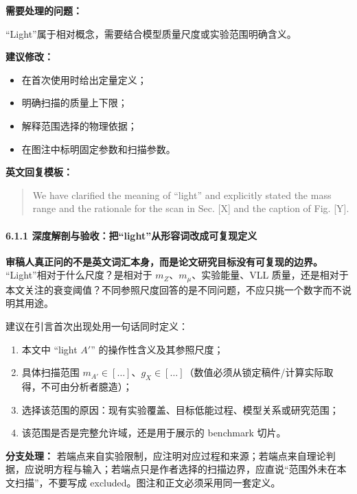 \documentclass[
  chinese,
  UTF8]{ctexart}
\providecommand{\tightlist}{%
  \setlength{\itemsep}{0pt}\setlength{\parskip}{0pt}}
\begin{document}
\textbf{需要处理的问题：}

``Light''属于相对概念，需要结合模型质量尺度或实验范围明确含义。

\textbf{建议修改：}

\begin{itemize}
\tightlist
\item
  在首次使用时给出定量定义；
\item
  明确扫描的质量上下限；
\item
  解释范围选择的物理依据；
\item
  在图注中标明固定参数和扫描参数。
\end{itemize}

\textbf{英文回复模板：}

\begin{quote}
We have clarified the meaning of ``light'' and explicitly stated the
mass range and the rationale for the scan in Sec. {[}X{]} and the
caption of Fig. {[}Y{]}.
\end{quote}

\paragraph{6.1.1
深度解剖与验收：把``light''从形容词改成可复现定义}\label{ux6df1ux5ea6ux89e3ux5256ux4e0eux9a8cux6536ux628alightux4eceux5f62ux5bb9ux8bcdux6539ux6210ux53efux590dux73b0ux5b9aux4e49}

\textbf{审稿人真正问的不是英文词汇本身，而是论文研究目标没有可复现的边界。}
``Light''相对于什么尺度？是相对于 \(m_Z\)、\(m_\mu\)、实验能量、VLL
质量，还是相对于本文关注的衰变阈值？不同参照尺度回答的是不同问题，不应只挑一个数字而不说明其用途。

建议在引言首次出现处用一句话同时定义：

\begin{enumerate}
\def\labelenumi{\arabic{enumi}.}
\tightlist
\item
  本文中 ``light \(A'\)'' 的操作性含义及其参照尺度；
\item
  具体扫描范围
  \(m_{A'}\in[\ldots]\)、\(g_X\in[\ldots]\)（数值必须从锁定稿件/计算实际取得，不可由分析者臆造）；
\item
  选择该范围的原因：现有实验覆盖、目标低能过程、模型关系或研究范围；
\item
  该范围是否是完整允许域，还是用于展示的 benchmark 切片。
\end{enumerate}

\textbf{分支处理：}
若端点来自实验限制，应注明对应过程和来源；若端点来自理论判据，应说明方程与输入；若端点只是作者选择的扫描边界，应直说``范围外未在本文扫描''，不要写成
excluded。图注和正文必须采用同一套定义。
\end{document}
